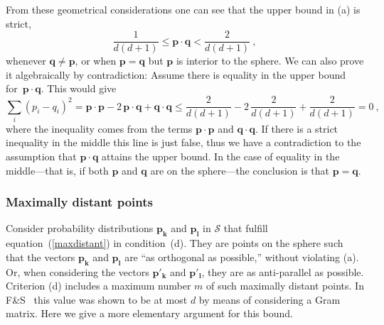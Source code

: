 \documentclass[letterpaper,11pt]{article}
\begin{document}
From these geometrical considerations one can see that the upper bound in (a) is strict,
%
\begin{equation}
   \frac{1}{d(d+1)} \leq \mathbf{p\cdot q} < \frac{2}{d(d+1)} \ ,
\end{equation}
%
whenever $\mathbf q \neq \mathbf p$, or when $\mathbf{p=q}$ but $\mathbf{p}$ is interior to the sphere. We can also prove it algebraically by contradiction: Assume there is equality in the upper bound for~$\mathbf{p\cdot q}$. This would give
%
\begin{equation} \label{proof}
   \sum_i (p_i-q_i)^2 =  \mathbf{p\cdot p} - 2\,\mathbf{p\cdot q} +\mathbf{q\cdot q} \leq
       \frac{2}{d(d+1)}-2\,\frac{2}{d(d+1)}+\frac{2}{d(d+1)}=0 \ ,
\end{equation}
%
where the inequality comes from the terms $ \mathbf{p\cdot p}$ and $\mathbf{q\cdot q}$. If there is a strict inequality in the middle this line is just false, thus we have a contradiction to the assumption that $\mathbf{p\cdot q}$ attains the upper bound. In the case of equality in the middle---that is, if both $\mathbf p$ and $\mathbf q$ are on the sphere---the conclusion is that $\mathbf{p=q}$.


\subsubsection{Maximally distant points} %

\indent \indent
Consider probability distributions $\mathbf{p_k}$ and $\mathbf{p_l}$ in $\mathcal{S}$ that fulfill equation~(\ref{maxdistant}) in condition~(d). They are points on the sphere such that the vectors $\mathbf{p_k}$ and $\mathbf{p_l}$ are ``as orthogonal as possible,'' without violating (a). Or, when considering the vectors $\mathbf{p'_k}$ and $\mathbf{p'_l}$, they are as anti-parallel as possible. Criterion (d) includes a maximum number $m$ of such maximally distant points. In F\&S~\cite{Fuchs&Schack} this value was shown to be at most $d$ by means of considering a Gram matrix. Here we give a more elementary argument for this bound.
\end{document}

